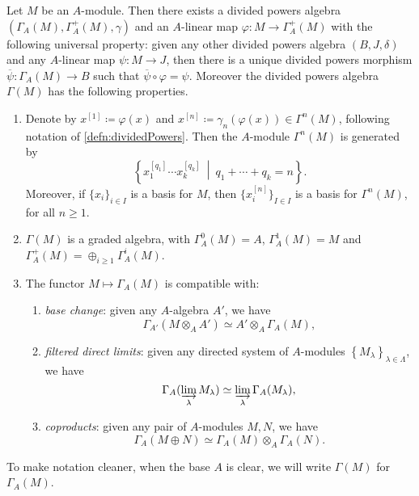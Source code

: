 \begin{thm}\label{thm:PDSymAlg}
	Let $M$ be an $A$-module.
	Then there exists a divided powers algebra 
	$\left(\Gamma_A(M), \Gamma_A^+(M), \gamma\right)$ and an $A$-linear
	map $\varphi\colon M \to \Gamma_A^+(M)$ with the following
	universal property:
	given any other divided powers algebra
	$\left(B, J, \delta\right)$ and any $A$-linear
	map $\psi\colon M \to J$,
	then there is a unique divided powers morphism
	$\overline{\psi}\colon \Gamma_A(M) \to B$
	such that $\overline{\psi} \circ \varphi = \psi$.
	Moreover the divided powers algebra $\Gamma(M)$ 
	has the following properties.
\begin{enumerate}
	\item Denote by $x^{[1]} \coloneqq \varphi(x)$ and $x^{[n]} \coloneqq \gamma_n(\varphi(x)) \in
		\Gamma^n(M)$, following notation of \cref{defn:dividedPowers}.
		Then the $A$-module $\Gamma^n(M)$ is generated by
		\begin{equation*}
		\left\{ x_1^{[q_1]} \cdots x_k^{[q_k]} \ \middle|\ 
		q_1 + \cdots + q_k = n \right\}
		.\end{equation*}
		Moreover, if $\{ x_i \}_{i \in I}$ is a basis
		for $M$, then $\{ x^{[n]}_i \}_{I \in I}$
		is a basis for $\Gamma^n(M)$,
		for all $n \geq 1$.

	\item $\Gamma(M)$ is a graded algebra, with
		$\Gamma_A^0(M) = A$, $\Gamma_A^1(M) = M$
		and $\Gamma_A^+(M) = \oplus_{i \geq 1} \Gamma_A^i(M)$.

	\item The functor $M \mapsto \Gamma_A(M)$ is compatible with:
		\begin{enumerate}
			\item {\em base change}: given any $A$-algebra $A'$,
				we have
				\begin{equation*}
					\Gamma_{A'}(M \otimes_A A') \simeq A' \otimes_A \Gamma_A(M)
				,\end{equation*}

			\item {\em filtered direct limits}: given any directed system
				of $A$-modules $\left\{ M_\lambda \right\}_{\lambda \in \Lambda}$, we have
				\begin{equation*}
					\Gamma_A(\varinjlim_\lambda M_\lambda) \simeq
					\varinjlim_\lambda \Gamma_A(M_\lambda)
				,\end{equation*}
				
			\item {\em coproducts}: given any pair of $A$-modules $M,N$, we have
				\begin{equation*}
					\Gamma_A(M \oplus N) \simeq
					\Gamma_A(M) \otimes_A \Gamma_A(N)
				.\end{equation*}
		\end{enumerate}
\end{enumerate}
	To make notation cleaner, when the base $A$ is clear, we
	will write $\Gamma(M)$ for $\Gamma_A(M)$.
\end{thm}


